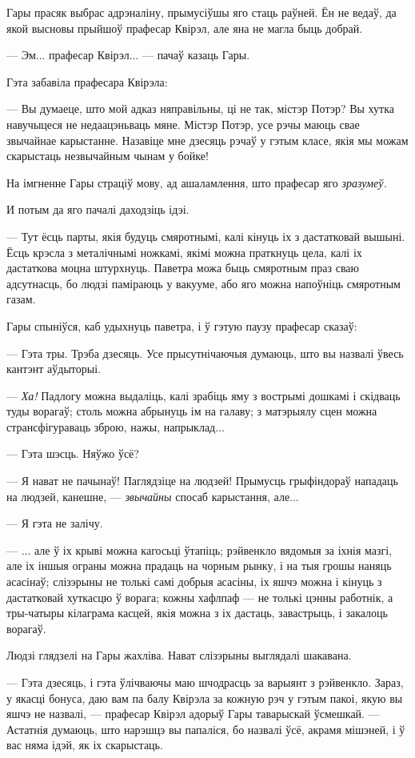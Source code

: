 Гары прасяк выбрас адрэналіну, прымусіўшы яго стаць раўней. Ён не ведаў, да якой 
высновы прыйшоў прафесар Квірэл, але яна не магла быць добрай.

--- Эм... прафесар Квірэл... --- пачаў казаць Гары.

Гэта забавіла прафесара Квірэла:

--- Вы думаеце, што мой адказ няправільны, ці не так, містэр Потэр? Вы 
хутка навучыцеся не недаацэньваць мяне. Містэр Потэр, усе рэчы маюць 
свае звычайнае карыстанне. Назавіце мне дзесяць рэчаў у гэтым класе, якія мы 
можам скарыстаць незвычайным чынам у бойке!

На імгненне Гары страціў мову, ад ашаламлення, што прафесар яго \emph{зразумеў.}

И потым да яго пачалі даходзіць ідэі.

--- Тут ёсць парты, якія будуць смяротнымі, калі кінуць іх з дастатковай вышыні. 
Ёсць крэсла з металічнымі ножкамі, якімі можна праткнуць цела, калі іх 
дастаткова моцна штурхнуць. Паветра можа быць смяротным праз сваю адсутнасць, 
бо людзі паміраюць у вакууме, або яго можна напоўніць смяротным газам.

Гары спыніўся, каб удыхнуць паветра, і ў гэтую паузу прафесар сказаў:

--- Гэта тры. Трэба дзесяць. Усе прысутнічаючыя думаюць, што вы назвалі ўвесь 
кантэнт аўдыторыі.

--- \emph{Ха!} Падлогу можна выдаліць, калі зрабіць яму з вострымі дошкамі і скідваць 
туды ворагаў; столь можна абрынуць ім на галаву; з матэрыялу сцен можна странсфігураваць
зброю, нажы, напрыклад...

--- Гэта шэсць. Няўжо ўсё?

--- Я нават не пачынаў! Паглядзіце на людзей! Прымусць грыфіндораў нападаць на людзей,
канешне, --- \emph{звычайны} спосаб карыстання, але...

--- Я гэта не залічу.

--- ... але ў іх крыві можна кагосьці ўтапіць; рэйвенкло вядомыя за іхнія мазгі,
але іх іншыя ограны можна прадаць на чорным рынку, і на тыя грошы наняць асасінаў;
слізэрыны не толькі самі добрыя асасіны, іх яшчэ можна і кінуць з дастатковай хуткасцю
ў ворага; кожны хафлпаф --- не толькі цэнны работнік, а тры-чатыры кілаграма 
касцей, якія можна з іх дастаць, завастрыць, і закалоць ворагаў. 

Людзі глядзелі на Гары жахліва. Нават слізэрыны выглядалі шакавана.

--- Гэта дзесяць, і гэта ўлічваючы маю шчодрасць за варыянт з рэйвенкло. Зараз,
у якасці бонуса,  даю вам па балу Квірэла за кожную рэч у гэтым пакоі, якую вы яшчэ не назвалі,
--- прафесар Квірэл адорыў Гары таварыскай ўсмешкай. --- Астатнія думаюць, што 
нарэшцэ вы папаліся, бо назвалі ўсё, акрамя мішэней, і ў вас няма ідэй, як іх скарыстаць.

